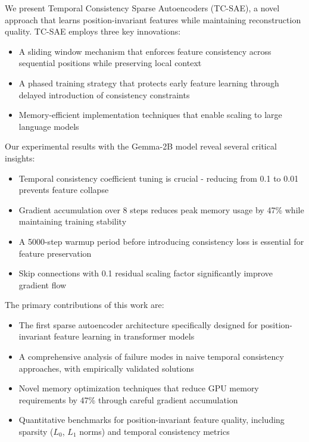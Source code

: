\documentclass{article} %
\begin{document}
We present Temporal Consistency Sparse Autoencoders (TC-SAE), a novel approach that learns position-invariant features while maintaining reconstruction quality. TC-SAE employs three key innovations:

\begin{itemize}
    \item A sliding window mechanism that enforces feature consistency across sequential positions while preserving local context
    \item A phased training strategy that protects early feature learning through delayed introduction of consistency constraints
    \item Memory-efficient implementation techniques that enable scaling to large language models
\end{itemize}

Our experimental results with the Gemma-2B model reveal several critical insights:

\begin{itemize}
    \item Temporal consistency coefficient tuning is crucial - reducing from 0.1 to 0.01 prevents feature collapse
    \item Gradient accumulation over 8 steps reduces peak memory usage by 47\% while maintaining training stability
    \item A 5000-step warmup period before introducing consistency loss is essential for feature preservation
    \item Skip connections with 0.1 residual scaling factor significantly improve gradient flow
\end{itemize}

The primary contributions of this work are:

\begin{itemize}
    \item The first sparse autoencoder architecture specifically designed for position-invariant feature learning in transformer models
    \item A comprehensive analysis of failure modes in naive temporal consistency approaches, with empirically validated solutions
    \item Novel memory optimization techniques that reduce GPU memory requirements by 47\% through careful gradient accumulation
    \item Quantitative benchmarks for position-invariant feature quality, including sparsity ($L_0$, $L_1$ norms) and temporal consistency metrics
\end{itemize}
\end{document}
